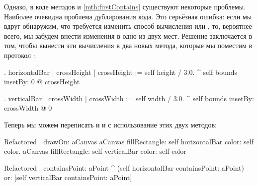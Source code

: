 \documentclass[a4paper,10pt,twoside]{book}
\begin{document}
Однако, в коде методов  и \ref{mth:firstContains} существуют некоторые проблемы.
Наиболее очевидна проблема дублирования кода.
Это серьёзная ошибка: если мы вдруг обнаружим, что требуется изменить способ вычисления  или , то, вероятнее всего, мы забудем внести изменения в одно из двух мест.
Решение заключается в том, чтобы вынести эти вычисления в два новых метода, которые мы поместим в протокол :

\begin{method}{.}
horizontalBar
	| crossHeight |
	crossHeight := self height / 3.0.
	^ self bounds insetBy: 0 @ crossHeight
\end{method}

\begin{method}{.}
verticalBar
	| crossWidth |
	crossWidth := self width / 3.0.
	^ self bounds insetBy: crossWidth @ 0
\end{method}

\noindent
Теперь мы можем переписать и  и  с использование этих двух методов:

\begin{method}{Refactored .}
drawOn: aCanvas 
	aCanvas fillRectangle: self horizontalBar color: self color.
	aCanvas fillRectangle: self verticalBar color: self color
\end{method}

\begin{method}{Refactored .}
containsPoint: aPoint 
	^ (self horizontalBar containsPoint: aPoint)
		or: [self verticalBar containsPoint: aPoint]
\end{method}
\end{document}
